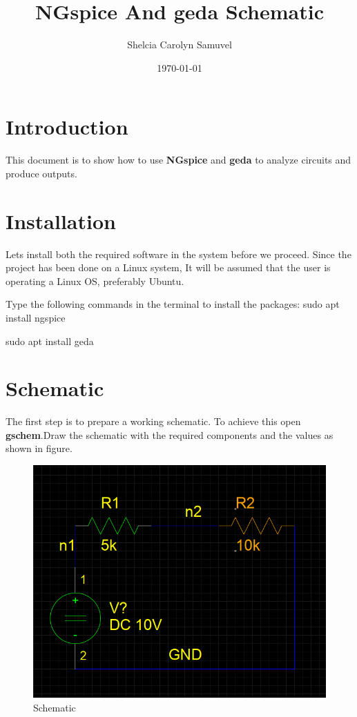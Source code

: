 \documentclass[a4paper,12pt]{article}
\begin{document}
\title{\textbf{NGspice And geda Schematic}}
\author{Shelcia Carolyn Samuvel}
\date{\today}
\maketitle

\tableofcontents
\newpage
{}

\section{Introduction}
This document is to show how to use \textbf{NGspice} and \textbf{geda} to analyze circuits and produce outputs.

\section{Installation}
Lets install both the required software in the system before we proceed. Since the project has been done on a Linux system, It will be assumed that the user is operating a Linux OS, preferably Ubuntu.

Type the following commands in the terminal to install the packages:
{\color{red}sudo apt install ngspice}

{\color{red}sudo apt install geda}



\newpage

\section{Schematic}

The first step is to prepare a working schematic. To achieve this open \textbf{gschem}.Draw the schematic with the required components and the values as shown in figure.

\begin{figure}[h!]
\centering
\includegraphics[width=1\textwidth]{Schematic.png}
\caption{Schematic}
\end{figure}
\end{document}
